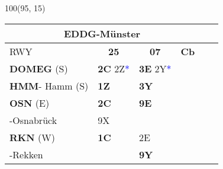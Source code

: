 \documentclass[10pt,landscape,a4paper]{article}
\begin{document}
\begin{textblock}{100}(95, 15)
\begin{table}[]
\begin{tabular}{|llllll}
\multicolumn{4}{c}{\textbf{EDDG-Münster}} \\ \hline
\multicolumn{1}{|l|}{RWY} 									& \multicolumn{1}{c|}{\textbf{25}} 			& \multicolumn{1}{c|}{\textbf{07}}  				& \multicolumn{1}{c|}{\textbf{Cb}} 						\\ \hline
\multicolumn{1}{|l|}{\textbf{DOMEG} (S)}							& \multicolumn{1}{l|}{\textbf{2C} 2Z\textcolor{blue}{*}}			& \multicolumn{1}{l|}{\textbf{3E} 2Y\textcolor{blue}{*}} 				& \multicolumn{1}{c|}{\multirow{6}{*}{\rotatebox{90}{5000ft}}}		\\
\multicolumn{1}{|l|}{\textbf{HMM}- Hamm (S)}						& \multicolumn{1}{l|}{\textbf{1Z}}			& \multicolumn{1}{l|}{\textbf{3Y}}				& \multicolumn{1}{c|}{}  								\\ \cline{1-3}

\multicolumn{1}{|l|}{\textbf{OSN} (E)} 								& \multicolumn{1}{l|}{\textbf{2C} } 			& \multicolumn{1}{l|}{\textbf{9E}}				& \multicolumn{1}{c|}{} 								 \\ \cline{5-6}
\multicolumn{1}{|l|}{-Osnabrück}								& \multicolumn{1}{l|}{9X}					& \multicolumn{1}{l|}{}						& \multicolumn{1}{c|}{} 								\\ \cline{1-3} \cline{5-6}

\multicolumn{1}{|l|}{\textbf{RKN} (W)} 							& \multicolumn{1}{l|}{\textbf{1C}}			& \multicolumn{1}{l|}{2E}						& \multicolumn{1}{c|}{}								\\
\multicolumn{1}{|l|}{-Rekken} 									& \multicolumn{1}{l|}{\textbf{}} 				& \multicolumn{1}{l|}{\textbf{9Y}}				& \multicolumn{1}{c|}{}  								\\ \hline
\end{tabular}
\end{table}
\end{textblock}
\end{document}
